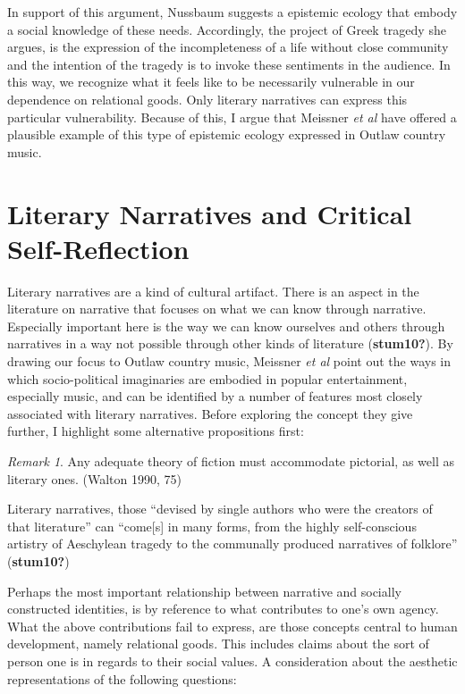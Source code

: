\documentclass[12pt]{book}
\theoremstyle{definition}
\theoremstyle{remark}
\newtheorem{remark}[theorem]{Remark}
\begin{document}
In support of this argument, Nussbaum suggests a epistemic ecology that embody a social knowledge of these needs. Accordingly, the project of Greek tragedy she argues, is the expression of the incompleteness of a life without close community and the intention of the tragedy is to invoke these sentiments in the audience. In this way, we recognize what it feels like to be necessarily vulnerable in our dependence on relational goods. Only literary narratives can express this particular vulnerability. Because of this, I argue that Meissner \emph{et al} have offered a plausible example of this type of epistemic ecology expressed in Outlaw country music.

\section{Literary Narratives and Critical Self-Reflection}\label{literary-narratives-and-critical-self-reflection}

Literary narratives are a kind of cultural artifact. There is an aspect in the literature on narrative that focuses on what we can know through narrative. Especially important here is the way we can know ourselves and others through narratives in a way not possible through other kinds of literature (\textbf{stum10?}). By drawing our focus to Outlaw country music, Meissner \emph{et al} point out the ways in which socio-political imaginaries are embodied in popular entertainment, especially music, and can be identified by a number of features most closely associated with literary narratives. Before exploring the concept they give further, I highlight some alternative propositions first:

\begin{remark}
Any adequate theory of fiction must accommodate pictorial, as well as literary ones. (Walton 1990, 75)

Literary narratives, those ``devised by single authors who were the creators of that literature'' can ``come{[}s{]} in many forms, from the highly self-conscious artistry of Aeschylean tragedy to the communally produced narratives of folklore'' (\textbf{stum10?})
\end{remark}

Perhaps the most important relationship between narrative and socially constructed identities, is by reference to what contributes to one's own agency. What the above contributions fail to express, are those concepts central to human development, namely relational goods. This includes claims about the sort of person one is in regards to their social values. A consideration about the aesthetic representations of the following questions:
\end{document}
